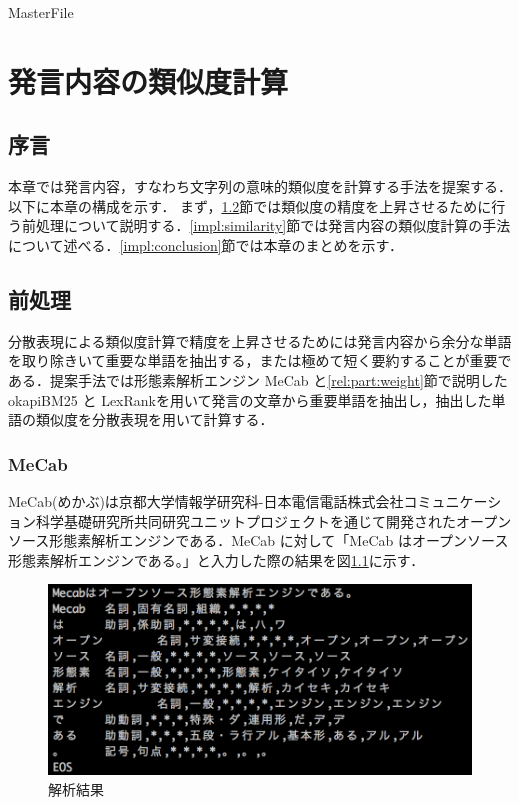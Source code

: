 \expandafter\ifx\csname MasterFile\endcsname\relax
	\def\SubFile{hoge}
	
	
	\setcounter{chapter}{3}
  \fi
  \cleardoublepage
\chapter{発言内容の類似度計算}

\label{impl:chapter}

\section{序言}
\label{impl:introduction}
本章では発言内容，すなわち文字列の意味的類似度を計算する手法を提案する．以下に本章の構成を示す．
まず，\ref{impl:preProcessing}節では類似度の精度を上昇させるために行う前処理について説明する．\ref{impl:similarity}節では発言内容の類似度計算の手法について述べる．\ref{impl:conclusion}節では本章のまとめを示す．

\section{前処理}
\label{impl:preProcessing}
分散表現による類似度計算で精度を上昇させるためには発言内容から余分な単語を取り除きいて重要な単語を抽出する，または極めて短く要約することが重要である．提案手法では形態素解析エンジン MeCab と\ref{rel:part:weight}節で説明したokapiBM25 と LexRankを用いて発言の文章から重要単語を抽出し，抽出した単語の類似度を分散表現を用いて計算する．
\subsection{MeCab}
MeCab(めかぶ)\cite{kudo2005mecab}は京都大学情報学研究科-日本電信電話株式会社コミュニケーション科学基礎研究所共同研究ユニットプロジェクトを通じて開発されたオープンソース形態素解析エンジンである．MeCab に対して「MeCab はオープンソース形態素解析エンジンである。」と入力した際の結果を図\ref{Fig:mecab}に示す．
\begin{figure}[htbp]
 \begin{center}
  \includegraphics[width=\textwidth]{../images/4.Implementation/mecab.png}
  \caption{解析結果}
  \label{Fig:mecab}
  \vspace{-10pt}
 \end{center}
\end{figure}

